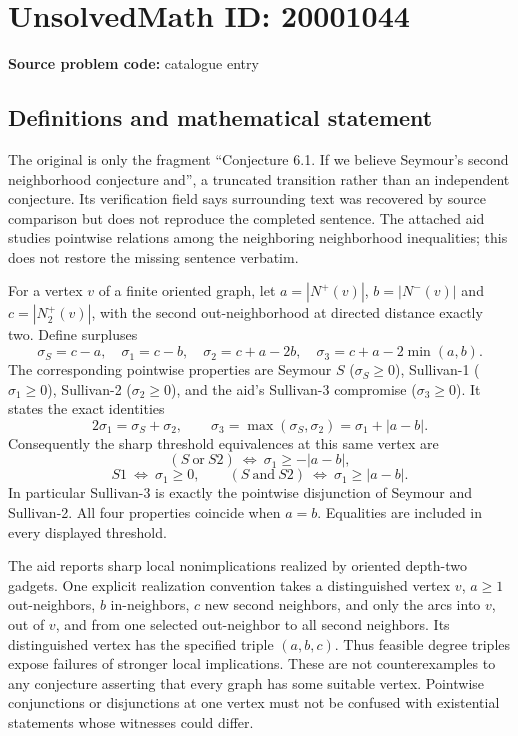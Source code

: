 \documentclass[11pt]{article}
\begin{document}
\section*{UnsolvedMath ID: 20001044}
\textbf{Source problem code:} catalogue entry
\subsection{Definitions and mathematical statement}
The original is only the fragment ``Conjecture 6.1. If we believe Seymour's second neighborhood conjecture and'', a truncated transition rather than an independent conjecture. Its verification field says surrounding text was recovered by source comparison but does not reproduce the completed sentence. The attached aid studies pointwise relations among the neighboring neighborhood inequalities; this does not restore the missing sentence verbatim.

For a vertex $v$ of a finite oriented graph, let $a=|N^+(v)|$, $b=|N^-(v)|$ and $c=|N_2^+(v)|$, with the second out-neighborhood at directed distance exactly two. Define surpluses
\[
\sigma_S=c-a,\quad\sigma_1=c-b,\quad\sigma_2=c+a-2b,\quad
\sigma_3=c+a-2\min(a,b).
\]
The corresponding pointwise properties are Seymour $S$ ($\sigma_S\ge0$), Sullivan-1 ($\sigma_1\ge0$), Sullivan-2 ($\sigma_2\ge0$), and the aid's Sullivan-3 compromise ($\sigma_3\ge0$). It states the exact identities
\[
2\sigma_1=\sigma_S+\sigma_2,\qquad
\sigma_3=\max(\sigma_S,\sigma_2)=\sigma_1+|a-b|.
\]
Consequently the sharp threshold equivalences at this same vertex are
\[
(S\ \text{or}\ S2)\ \Longleftrightarrow\ \sigma_1\ge-|a-b|,
\]
\[
S1\ \Longleftrightarrow\ \sigma_1\ge0,\qquad
(S\ \text{and}\ S2)\ \Longleftrightarrow\ \sigma_1\ge|a-b|.
\]
In particular Sullivan-3 is exactly the pointwise disjunction of Seymour and Sullivan-2. All four properties coincide when $a=b$. Equalities are included in every displayed threshold.

The aid reports sharp local nonimplications realized by oriented depth-two gadgets. One explicit realization convention takes a distinguished vertex $v$, $a\ge1$ out-neighbors, $b$ in-neighbors, $c$ new second neighbors, and only the arcs into $v$, out of $v$, and from one selected out-neighbor to all second neighbors. Its distinguished vertex has the specified triple $(a,b,c)$. Thus feasible degree triples expose failures of stronger local implications. These are not counterexamples to any conjecture asserting that every graph has some suitable vertex. Pointwise conjunctions or disjunctions at one vertex must not be confused with existential statements whose witnesses could differ.
\end{document}
